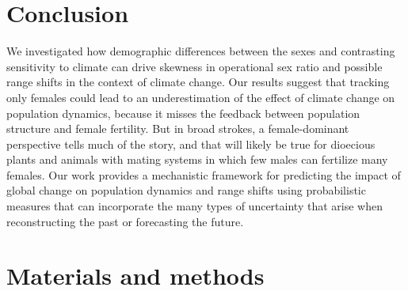 \documentclass[9pt,twocolumn,twoside,lineno]{pnas-new}
\begin{document}
\section*{Conclusion}
We investigated how demographic differences between the sexes and contrasting sensitivity to climate can drive skewness in operational sex ratio and possible range shifts in the context of climate change. 
Our results suggest that tracking only females could lead to an underestimation of the effect of climate change on population dynamics, because it misses the feedback between population structure and female fertility. 
But in broad strokes, a female-dominant perspective tells much of the story, and that will likely be true for dioecious plants and animals with mating systems in which few males can fertilize many females. 
Our work provides a mechanistic framework for predicting the impact of global change on population dynamics and range shifts using probabilistic measures that can incorporate the many types of uncertainty that arise when reconstructing the past or forecasting the future. 

\section*{Materials and methods}
\end{document}
